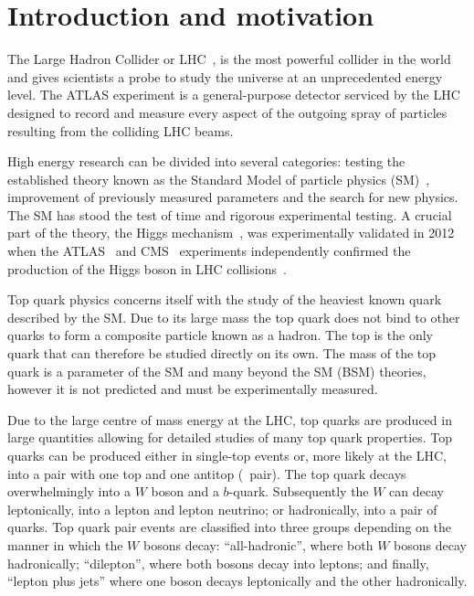 \chapter{Introduction and motivation}\label{sec:Introduction}

The Large Hadron Collider or LHC~\cite{LHC}, is the most powerful collider in the world and gives scientists a probe to study the universe at an unprecedented energy level. The ATLAS experiment is a general-purpose detector serviced by the LHC designed to record and measure every aspect of the outgoing spray of particles resulting from the colliding LHC beams.

High energy research can be divided into several categories: testing the established theory known as the Standard Model of particle physics (SM)~\cite{Theory:IntroGriffiths}, improvement of previously measured parameters and the search for new physics. The SM has stood the test of time and rigorous experimental testing. A crucial part of the theory, the Higgs mechanism~\cite{HiggsOne,HiggsTwo,HiggsThree,HiggsFour,HiggsFive}, was experimentally validated in 2012 when the ATLAS~\cite{Detector:ATLASExperimentGeneral} and CMS~\cite{CMS} experiments independently confirmed the production of the Higgs boson in LHC collisions~\cite{Theory:HiggsDiscoveryATLAS,Theory:HiggsDiscoveryCMS}.

Top quark physics concerns itself with the study of the heaviest known quark described by the SM\@. Due to its large mass the top quark does not bind to other quarks to form a composite particle known as a hadron. The top is the only quark that can therefore be studied directly on its own. The mass of the top quark is a parameter of the SM and many beyond the SM (BSM) theories, however it is not predicted and must be experimentally measured.

Due to the large centre of mass energy at the LHC, top quarks are produced in large quantities allowing for detailed studies of many top quark properties. Top quarks can be produced either in single-top events or, more likely at the LHC, into a pair with one top and one antitop (\ttbar\ pair). The top quark decays overwhelmingly into a $W$ boson and a $b$-quark. Subsequently the $W$ can decay leptonically, into a lepton and lepton neutrino; or hadronically, into a pair of quarks. Top quark pair events are classified into three groups depending on the manner in which the $W$ bosons decay: ``all-hadronic'', where both $W$ bosons decay hadronically; ``dilepton'', where both bosons decay into leptons; and finally, ``lepton plus jets'' where one boson decays leptonically and the other hadronically.

